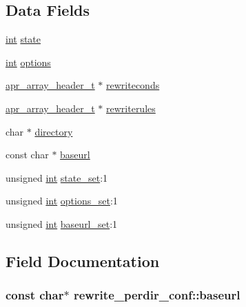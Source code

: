 \subsection*{Data Fields}
\begin{DoxyCompactItemize}
\item 
\hyperlink{pcre_8txt_a42dfa4ff673c82d8efe7144098fbc198}{int} \hyperlink{structrewrite__perdir__conf_ada92565d48c2a643e08ad1b52ae33ec0}{state}
\item 
\hyperlink{pcre_8txt_a42dfa4ff673c82d8efe7144098fbc198}{int} \hyperlink{structrewrite__perdir__conf_ad42e9dac20deb7615782b2059d622723}{options}
\item 
\hyperlink{structapr__array__header__t}{apr\+\_\+array\+\_\+header\+\_\+t} $\ast$ \hyperlink{structrewrite__perdir__conf_aeb07780a77f9247a698f5d5168cd83d6}{rewriteconds}
\item 
\hyperlink{structapr__array__header__t}{apr\+\_\+array\+\_\+header\+\_\+t} $\ast$ \hyperlink{structrewrite__perdir__conf_ade3b47b0ad02b91b5b23e3c2af433b56}{rewriterules}
\item 
char $\ast$ \hyperlink{structrewrite__perdir__conf_ad277f161b0bb142679918afe179a2f8d}{directory}
\item 
const char $\ast$ \hyperlink{structrewrite__perdir__conf_a269c7d953d46f7fa48a93c778d183a51}{baseurl}
\item 
unsigned \hyperlink{pcre_8txt_a42dfa4ff673c82d8efe7144098fbc198}{int} \hyperlink{structrewrite__perdir__conf_a6b68647d252e55c7b21dd0920407cf2d}{state\+\_\+set}\+:1
\item 
unsigned \hyperlink{pcre_8txt_a42dfa4ff673c82d8efe7144098fbc198}{int} \hyperlink{structrewrite__perdir__conf_a8bf0307f47bc9762f1c28f42f91ab2c1}{options\+\_\+set}\+:1
\item 
unsigned \hyperlink{pcre_8txt_a42dfa4ff673c82d8efe7144098fbc198}{int} \hyperlink{structrewrite__perdir__conf_a45fad1afc4c35eacef5ce66c78715c03}{baseurl\+\_\+set}\+:1
\end{DoxyCompactItemize}


\subsection{Field Documentation}
\subsubsection[{\texorpdfstring{baseurl}{baseurl}}]{\setlength{\rightskip}{0pt plus 5cm}const char$\ast$ rewrite\+\_\+perdir\+\_\+conf\+::baseurl}\hypertarget{structrewrite__perdir__conf_a269c7d953d46f7fa48a93c778d183a51}{}\label{structrewrite__perdir__conf_a269c7d953d46f7fa48a93c778d183a51}
